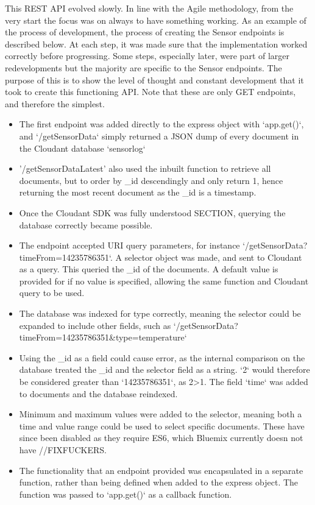 \documentclass{article}
\begin{document}
This REST API evolved slowly. In line with the Agile methodology, from the very start the focus was on always to have something working. As an example of the process of development, the process of creating the Sensor endpoints is described below. At each step, it was made sure that the implementation worked correctly before progressing. Some steps, especially later, were part of larger redevelopments but the majority are specific to the Sensor endpoints. The purpose of this is to show the level of thought and constant development that it took to create this functioning API. Note that these are only GET endpoints, and therefore the simplest.

\begin{itemize}
	\item The first endpoint was added directly to the express object with `app.get()`, and `/getSensorData` simply returned a JSON dump of every document in the Cloudant database `sensorlog`
	\item '/getSensorDataLatest' also used the inbuilt function to retrieve all documents, but to order by \_id descendingly and only return 1, hence returning the most recent document as the \_id is a timestamp. 
	\item Once the Cloudant SDK was fully understood SECTION, querying the database correctly became possible.
	\item The endpoint accepted URI query parameters, for instance `/getSensorData?timeFrom=14235786351`. A selector object was made, and sent to Cloudant as a query. This queried the \_id of the documents. A default value is provided for if no value is specified, allowing the same function and Cloudant query to be used.
	\item The database was indexed for type correctly, meaning the selector could be expanded to include other fields, such as `/getSensorData?timeFrom=14235786351\&type=temperature`
	\item Using the \_id as a field could cause error, as the internal comparison on the database treated the \_id and the selector field as a string. `2` would therefore be considered greater than `14235786351`, as 2\textgreater 1. The field `time` was added to documents and the database reindexed.
	\item Minimum and maximum values were added to the selector, meaning both a time and value range could be used to select specific documents. These have since been disabled as they require ES6, which Bluemix currently doesn not have //FIXFUCKERS.
	\item The functionality that an endpoint provided was encapsulated in a separate function, rather than being defined when added to the express object. The function was passed to `app.get()` as a callback function.

\end{itemize}
\end{document}
